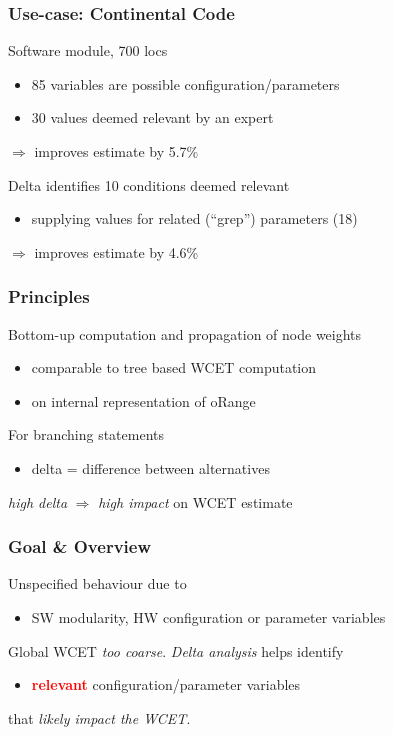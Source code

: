 \documentclass{beamer}
\begin{document}
\begin{frame}[fragile]
  \frametitle{Use-case: Continental Code}

  \bigskip
  Software module, 700 locs
  \begin{itemize}
    \item 85 variables are possible configuration/parameters
    \item 30 values deemed relevant by an expert
  \end{itemize}

  \medskip
  $\Rightarrow$ improves estimate by 5.7\% \\

  \pause 

  \bigskip
  Delta identifies 10 conditions deemed relevant
  \begin{itemize}
    \item supplying values for related (``grep'') parameters (18)
  \end{itemize}

  \medskip
  $\Rightarrow$ improves estimate by 4.6\%
\end{frame}



\begin{frame}[fragile]
  \frametitle{Principles}
  \bigskip
  Bottom-up computation and propagation of node weights
  \begin{itemize}
    \item comparable to tree based WCET computation
    \item on internal representation of oRange
  \end{itemize}

  \pause 

  \bigskip
  For branching statements
  \begin{itemize}
    \item delta = difference between alternatives
  \end{itemize}

  \medskip
  {\it high delta} $\Rightarrow$ {\it high impact} on WCET estimate
\end{frame}



\begin{frame}[fragile]
  \frametitle{Goal \& Overview}

  \bigskip
  Unspecified behaviour due to 
  \begin{itemize}
    \item SW modularity, HW configuration or parameter variables
  \end{itemize}

  \pause

  \bigskip
  Global WCET {\it too coarse}. {\it Delta analysis} helps identify 
  \begin{itemize}
    \item \textcolor{red}{\bf relevant} configuration/parameter variables
  \end{itemize}
  that {\it likely impact the WCET}.
\end{frame} 
\end{document}
